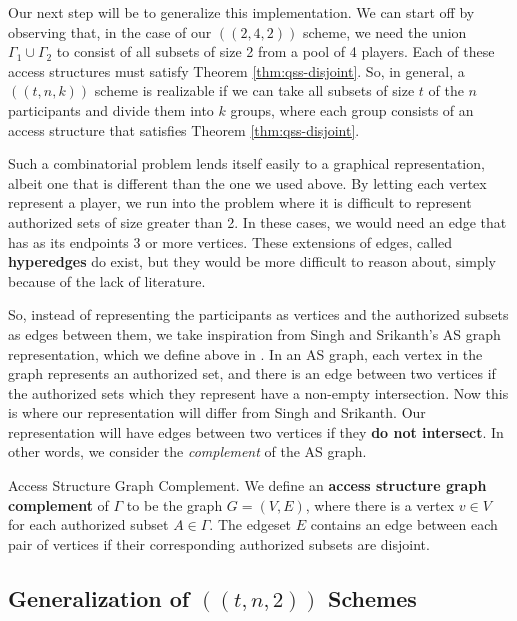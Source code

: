 Our next step will be to generalize this implementation. We can start off by observing that, in the case of our $((2,4,2))$ scheme, we need the union $\Gamma_1 \cup \Gamma_2$ to consist of all subsets of size 2 from a pool of 4 players. Each of these access structures must satisfy Theorem \ref{thm:qss-disjoint}. So, in general, a $((t,n,k))$ scheme is realizable if we can take all subsets of size $t$ of the $n$ participants and divide them into $k$ groups, where each group consists of an access structure that satisfies Theorem \ref{thm:qss-disjoint}. 

Such a combinatorial problem lends itself easily to a graphical representation, albeit one that is different than the one we used above. By letting each vertex represent a player, we run into the problem where it is difficult to represent authorized sets of size greater than 2. In these cases, we would need an edge that has as its endpoints 3 or more vertices. These extensions of edges, called \textbf{hyperedges} do exist, but they would be more difficult to reason about, simply because of the lack of literature.

So, instead of representing the participants as vertices and the authorized subsets as edges between them, we take inspiration from Singh and Srikanth's AS graph representation, which we define above in  \cite{singh_assisted_2004}. In an AS graph, each vertex in the graph represents an authorized set, and there is an edge between two vertices if the authorized sets which they represent have a non-empty intersection. Now this is where our representation will differ from Singh and Srikanth. Our representation will have edges between two vertices if they \textbf{do not intersect}. In other words, we consider the \textit{complement} of the AS graph.

\begin{definition}{Access Structure Graph Complement.}
    \label{defn:access-structure-graph-complement}
	We define an \textbf{access structure graph complement} of $\Gamma$ to be the graph $G = (V,E)$, where there is a vertex $v \in V$ for each authorized subset $A \in \Gamma$. The edgeset $E$ contains an edge between each pair of vertices if their corresponding authorized subsets are disjoint.
\end{definition}

\subsection{Generalization of $((t,n,2))$ Schemes}
\label{ssec:generalize-t-n-2}

